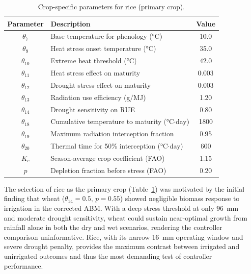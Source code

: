\begin{table}[htbp]
\centering
\caption{Crop-specific parameters for rice (primary crop).}
\label{tab:rice}
\begin{tabular}{clc}
\toprule
\textbf{Parameter} & \textbf{Description} & \textbf{Value} \\
\midrule
$\theta_7$    & Base temperature for phenology (°C)                     & 10.0 \\
$\theta_9$    & Heat stress onset temperature (°C)                      & 35.0 \\
$\theta_{10}$ & Extreme heat threshold (°C)                             & 42.0 \\
$\theta_{11}$ & Heat stress effect on maturity                          & 0.003 \\
$\theta_{12}$ & Drought stress effect on maturity                       & 0.003 \\
$\theta_{13}$ & Radiation use efficiency (g/MJ)                         & 1.20 \\
$\theta_{14}$ & Drought sensitivity on RUE                              & 0.80 \\
$\theta_{18}$ & Cumulative temperature to maturity (°C$\cdot$day)       & 1800 \\
$\theta_{19}$ & Maximum radiation interception fraction                  & 0.95 \\
$\theta_{20}$ & Thermal time for 50\% interception (°C$\cdot$day)       & 600 \\
$K_c$         & Season-average crop coefficient (FAO)                   & 1.15 \\
$p$           & Depletion fraction before stress (FAO)                  & 0.20 \\
\bottomrule
\end{tabular}
\end{table}

The selection of rice as the primary crop (Table~\ref{tab:rice}) was motivated by the initial finding that wheat ($\theta_{14} = 0.5$, $p = 0.55$) showed negligible biomass response to irrigation in the corrected ABM. With a deep stress threshold at only 96~mm and moderate drought sensitivity, wheat could sustain near-optimal growth from rainfall alone in both the dry and wet scenarios, rendering the controller comparison uninformative. Rice, with its narrow 16~mm operating window and severe drought penalty, provides the maximum contrast between irrigated and unirrigated outcomes and thus the most demanding test of controller performance.



